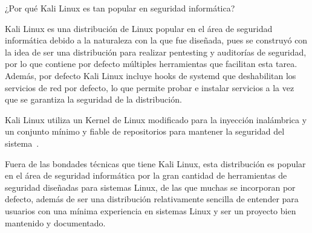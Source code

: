 ¿Por qué Kali Linux es tan popular en seguridad informática?

Kali Linux es una distribución de Linux popular en el área de seguridad informática debido a la naturaleza con la que fue diseñada, pues se construyó con la idea de ser una distribución para realizar pentesting y auditorías de seguridad, por lo que contiene por defecto múltiples herramientas que facilitan esta tarea. Además, por defecto Kali Linux incluye hooks de systemd que deshabilitan los servicios de red por defecto, lo que permite probar e instalar servicios a la vez que se garantiza la seguridad de la distribución.

Kali Linux utiliza un Kernel de Linux modificado para la inyección inalámbrica y un conjunto mínimo y fiable de repositorios para mantener la seguridad del sistema~\cite{kali_docs}.

Fuera de las bondades técnicas que tiene Kali Linux, esta distribución es popular en el área de seguridad informática por la gran cantidad de herramientas de seguridad diseñadas para sistemas Linux, de las que muchas se incorporan por defecto, además de ser una distribución relativamente sencilla de entender para usuarios con una mínima experiencia en sistemas Linux y ser un proyecto bien mantenido y documentado.
